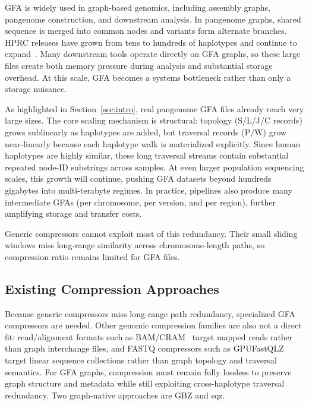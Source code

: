 GFA is widely used in graph-based genomics, including assembly graphs, pangenome construction, and downstream analysis. In pangenome graphs, shared sequence is merged into common nodes and variants form alternate branches. HPRC releases have grown from tens to hundreds of haplotypes and continue to expand~\cite{wang2022human,hprc_timeline}. Many downstream tools operate directly on GFA graphs, so these large files create both memory pressure during analysis and substantial storage overhead. At this scale, GFA becomes a systems bottleneck rather than only a storage nuisance.

As highlighted in Section~\ref{sec:intro}, real pangenome GFA files already reach very large sizes. The core scaling mechanism is structural: topology (S/L/J/C records) grows sublinearly as haplotypes are added, but traversal records (P/W) grow near-linearly because each haplotype walk is materialized explicitly. Since human haplotypes are highly similar, these long traversal streams contain substantial repeated node-ID substrings across samples. At even larger population sequencing scales, this growth will continue, pushing GFA datasets beyond hundreds gigabytes into multi-terabyte regimes. In practice, pipelines also produce many intermediate GFAs (per chromosome, per version, and per region), further amplifying storage and transfer costs.

Generic compressors cannot exploit most of this redundancy. Their small sliding windows miss long-range similarity across chromosome-length paths, so compression ratio remains limited for GFA files.

\subsection{Existing Compression Approaches}\label{subsec:existing}

Because generic compressors miss long-range path redundancy, specialized GFA compressors are needed. Other genomic compression families are also not a direct fit: read/alignment formats such as BAM/CRAM~\cite{li2009sequence, bonfield2022cram} target mapped reads rather than graph interchange files, and FASTQ compressors such as GPUFastQLZ~\cite{yang2024gpufastqlz} target linear sequence collections rather than graph topology and traversal semantics. For GFA graphs, compression must remain fully lossless to preserve graph structure and metadata while still exploiting cross-haplotype traversal redundancy.
Two graph-native approaches are GBZ and sqz.

